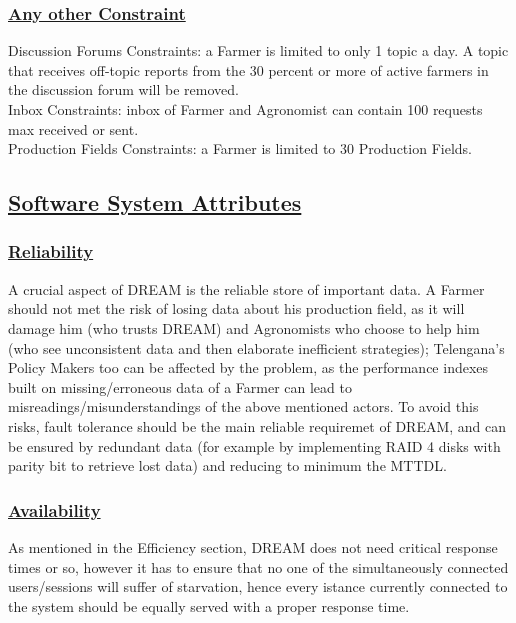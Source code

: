 		\subsubsection[Any other Constraint]{\hyperlink{toc}{Any other Constraint}}
			Discussion Forums Constraints: a Farmer is limited to only 1 topic a day. A topic that receives off-topic reports from the 30 percent or more of active farmers in the discussion forum will be removed. \\
			
			Inbox Constraints: inbox of Farmer and Agronomist can contain 100 requests max received or sent. \\
			
			Production Fields Constraints: a Farmer is limited to 30 Production Fields.
	
	\subsection[Software System Attributes]{\hyperlink{toc}{Software System Attributes}}
		\subsubsection[Reliability]{\hyperlink{toc}{Reliability}}
		A crucial aspect of DREAM is the reliable store of important data. A Farmer should not met the risk of losing data about his production field, as it will damage him (who trusts DREAM) and Agronomists who choose to help him (who see unconsistent data and then elaborate inefficient strategies); Telengana's Policy Makers too can be affected by the problem, as the performance indexes built on missing/erroneous data of a Farmer can lead to misreadings/misunderstandings of the above mentioned actors. To avoid this risks, fault tolerance should be the main reliable requiremet of DREAM, and can be ensured by redundant data (for example by implementing RAID 4 disks with parity bit to retrieve lost data) and reducing to minimum the MTTDL.
		\subsubsection[Availability]{\hyperlink{toc}{Availability}}
		As mentioned in the Efficiency section, DREAM does not need critical response times or so, however it has to ensure that no one of the simultaneously connected users/sessions will suffer of starvation, hence every istance currently connected to the system should be equally served with a proper response time.
